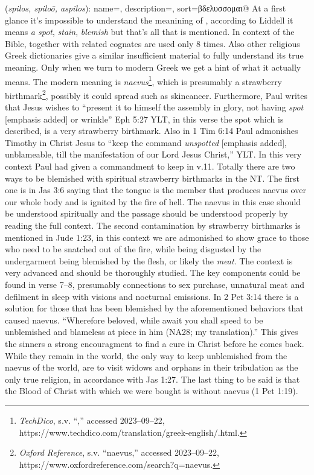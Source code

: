 \item[Birthmark,]

(\textit{spilos, spiloō, aspilos}):
{
    name=,
    description={},
    sort=βδελυσσομαι@
} At a first glance it's impossible to understand the meanining of , 
according to Liddell it means \emph{a spot}, \emph{stain}, \emph{blemish} but that's all
that is mentioned. In context of the Bible,  together with related cognates 
are used only 8 times. Also other religious Greek dictionaries give a similar insufficient
material to fully understand its true meaning. Only when we turn to modern Greek we get a
hint of what it actually means. The modern meaning is 
\emph{naevus}\footnote{\emph{TechDico}, s.v. ``,'' accessed 2023--09--22,\\https://www.techdico.com/translation/greek-english/.html.},
which is presumably a strawberry birthmark\footnote{\emph{Oxford Reference}, s.v. ``naevus,'' accessed 2023--09--22,\\https://www.oxfordreference.com/search?q=naevus.}, 
possibly it could spread such as skincancer. 
Furthermore, Paul writes that Jesus wishes to ``present it to himself the assembly in glory, not having \emph{spot} [emphasis added] or wrinkle'' Eph 5:27 YLT, in this verse
the spot which is described, is a very strawberry birthmark. Also in 1 Tim 6:14 Paul admonishes Timothy in Christ Jesus to ``keep the command \emph{unspotted} [emphasis added], 
unblameable, till the manifestation of our Lord Jesus Christ,'' YLT. In this very context Paul had given a commandment to keep in v.11. Totally there are two ways to be
blemished with spiritual strawberry birthmarks in the NT. The first one is in Jas 3:6 saying that the tongue is the member that produces naevus over our whole body and is
ignited by the fire of hell. The naevus in this case should be understood spiritually and the passage should be understood properly by reading the full context.
The second contamination by strawberry birthmarks is mentioned in Jude 1:23, in this context we are admonished to show grace to those who need to be snatched out of the
fire, while being disgusted by the undergarment being blemished by the flesh, or likely the \emph{meat}. The context is very advanced and should be thoroughly
studied. The key components could be found in verse 7--8, presumably connections to sex purchase, unnatural meat and defilment in sleep with visions and nocturnal emissions.
In 2 Pet 3:14 there is a solution for those that has been blemished by the aforementioned behaviors that caused naevus. ``Wherefore beloved, while await you shall speed to be 
unblemished and blameless at piece in him (NA28; my translation).'' This gives the sinners a strong encouragment to find a cure in Christ before he comes back. While they remain
in the world, the only way to keep unblemished from the naevus of the world, are to visit widows and orphans in their tribulation as the only true religion, in accordance with Jas 1:27.
The last thing to be said is that the Blood of Christ with which we were bought is without naevus (1 Pet 1:19).
